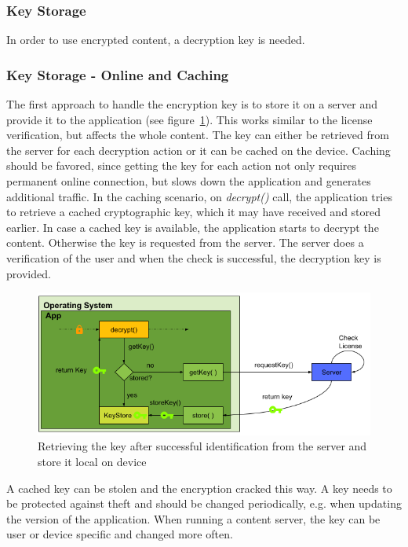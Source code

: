 \newpage
\subsubsection{Key Storage} \label{section:counter-replace-encryption-key}
In order to use encrypted content, a decryption key is needed.

\subsubsection{Key Storage - Online and Caching} \label{section:counter-replace-encryption-key-online}
The first approach to handle the encryption key is to store it on a server and provide it to the application (see figure~\ref{fig:encryptionKeyServer}).
This works similar to the license verification, but affects the whole content.
\newline
The key can either be retrieved from the server for each decryption action or it can be cached on the device.
Caching should be favored, since getting the key for each action not only requires permanent online connection, but slows down the application and generates additional traffic.
\newline
In the caching scenario, on \textit{decrypt()} call, the application tries to retrieve a cached cryptographic key, which it may have received and stored earlier.
In case a cached key is available, the application starts to decrypt the content.
Otherwise the key is requested from the server.
The server does a verification of the user and when the check is successful, the decryption key is provided.
\newline
\begin{figure}[h]
    \centering
    \includegraphics[width=1\textwidth]{data/encryptionKeyServer.png}
    \caption{Retrieving the key after successful identification from the server and store it local on device}
    \label{fig:encryptionKeyServer}
\end{figure}
\newline
A cached key can be stolen \cite{memoryDump} and the encryption cracked this way.
A key needs to be protected against theft and should be changed periodically, e.g. when updating the version of the application.
When running a content server, the key can be user or device specific and changed more often.


